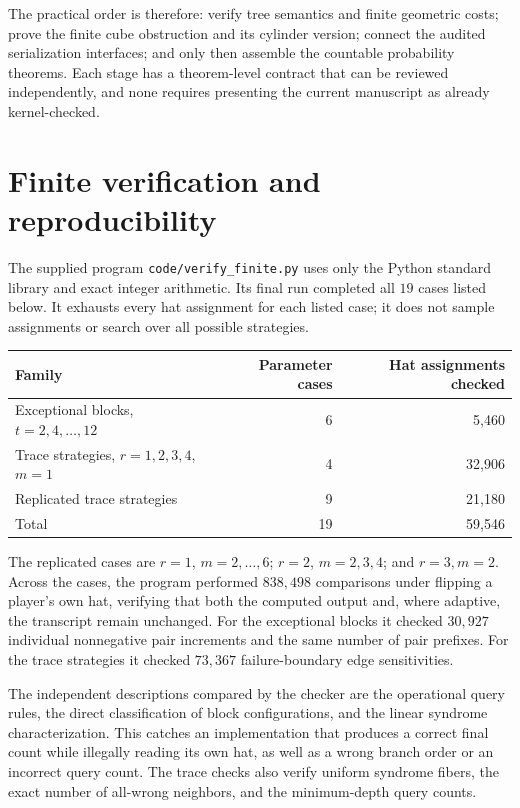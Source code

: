 \documentclass[11pt,letterpaper]{article}
\theoremstyle{definition}
\begin{document}
The practical order is therefore: verify tree semantics and finite geometric
costs; prove the finite cube obstruction and its cylinder version; connect
the audited serialization interfaces; and only then assemble the countable
probability theorems.  Each stage has a theorem-level contract that can be
reviewed independently, and none requires presenting the current manuscript
as already kernel-checked.



\section{Finite verification and reproducibility}
\label{mbg:insp:sec:verification}

The supplied program \nolinkurl{code/verify_finite.py} uses only the
Python standard library and exact integer arithmetic. Its final run
completed all \(19\) cases listed below. It exhausts every hat assignment
for each listed case; it does not sample assignments or search over
all possible strategies.

\begin{center}
\begin{tabular}{lrr}
\toprule
Family & Parameter cases & Hat assignments checked\\
\midrule
Exceptional blocks, \(t=2,4,\ldots,12\) & 6 & 5,460\\
Trace strategies, \(r=1,2,3,4\), \(m=1\) & 4 & 32,906\\
Replicated trace strategies & 9 & 21,180\\
\midrule
Total & 19 & 59,546\\
\bottomrule
\end{tabular}
\end{center}

The replicated cases are \(r=1\), \(m=2,\ldots,6\);
\(r=2\), \(m=2,3,4\); and \(r=3,m=2\).
Across the cases, the program performed \(838{,}498\) comparisons under
flipping a player's own hat, verifying that both the computed output
and, where adaptive, the transcript remain unchanged.
For the exceptional blocks it checked \(30{,}927\) individual
nonnegative pair increments and the same number of pair prefixes.
For the trace strategies it checked \(73{,}367\) failure-boundary
edge sensitivities.

The independent descriptions compared by the checker are the operational
query rules, the direct classification of block configurations, and the
linear syndrome characterization. This catches an implementation that
produces a correct final count while illegally reading its own hat, as
well as a wrong branch order or an incorrect query count. The trace
checks also verify uniform syndrome fibers, the exact number of
all-wrong neighbors, and the minimum-depth query counts.
\end{document}
